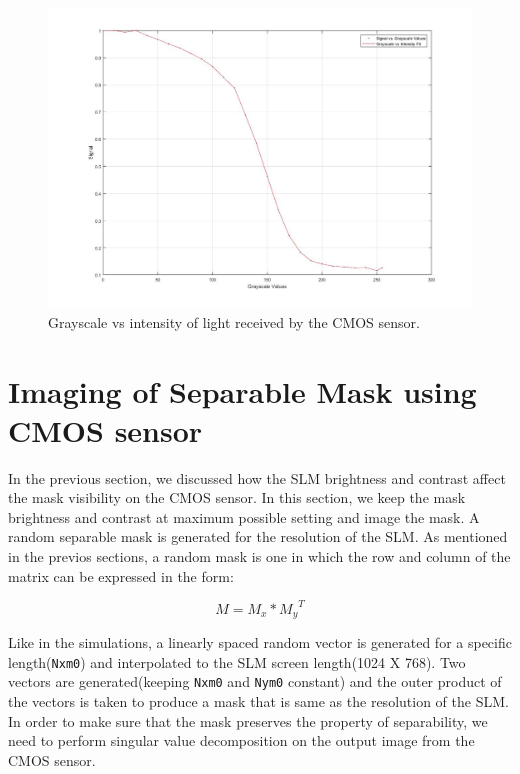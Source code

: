 \begin{figure}[!htbp]
\centering
\includegraphics[width = \linewidth]{pics/slm/grayscale_slm_graph.jpg}
\caption{Grayscale vs intensity of light received by the CMOS sensor.}
\label{fig:grayscale_slm_graph}
\end{figure}

\section{Imaging of Separable Mask using CMOS sensor}
In the previous section, we discussed how the SLM brightness and contrast affect the mask visibility on the CMOS sensor. In this section, we keep the mask brightness and contrast at maximum possible setting and image the mask. A random separable mask is generated for the resolution of the SLM. As mentioned in the previos sections, a random mask is one in which the row and column of the matrix can be expressed in the form:

$$
M = M_{x} * {M_{y}}^T
$$

Like in the simulations, a linearly spaced random vector is generated for a specific length(\texttt{Nxm0}) and interpolated to the SLM screen length(1024 X 768). Two vectors are generated(keeping \texttt{Nxm0} and \texttt{Nym0} constant) and the outer product of the vectors is taken to produce a mask that is same as the resolution of the SLM.
In order to make sure that the mask preserves the property of separability, we need to perform singular value decomposition on the output image from the CMOS sensor.

